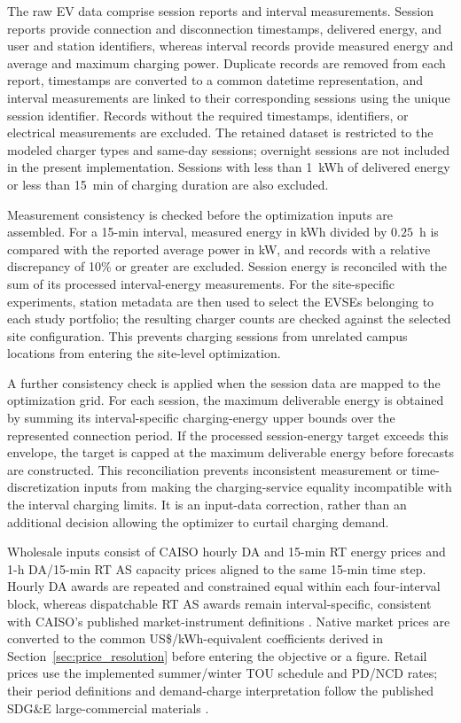 \documentclass[final,5p,times]{elsarticle}
\begin{document}
The raw EV data comprise session reports and interval
measurements. Session reports provide connection and
disconnection timestamps, delivered energy, and user and
station identifiers, whereas interval records provide measured
energy and average and maximum charging power. Duplicate
records are removed from each report, timestamps are converted
to a common datetime representation, and interval measurements
are linked to their corresponding sessions using the unique
session identifier. Records without the required timestamps,
identifiers, or electrical measurements are excluded. The
retained dataset is restricted to the modeled charger types
and same-day sessions; overnight sessions are not included in
the present implementation. Sessions with less than
1~kWh of delivered energy or less than 15~min of charging
duration are also excluded.

Measurement consistency is checked before the optimization
inputs are assembled. For a 15-min interval, measured energy
in kWh divided by $0.25$~h is compared with the reported
average power in kW, and records with a relative discrepancy
of 10\% or greater are excluded. Session energy is reconciled
with the sum of its processed interval-energy measurements.
For the site-specific experiments, station metadata are then
used to select the EVSEs belonging to each study portfolio;
the resulting charger counts are checked against the selected
site configuration. This prevents charging sessions from
unrelated campus locations from entering the site-level
optimization.

A further consistency check is applied when the session data
are mapped to the optimization grid. For each session, the
maximum deliverable energy is obtained by summing its
interval-specific charging-energy upper bounds over the
represented connection period. If the processed session-energy
target exceeds this envelope, the target is capped at the
maximum deliverable energy before forecasts are constructed.
This reconciliation prevents inconsistent measurement or
time-discretization inputs from making the charging-service
equality incompatible with the interval charging limits.
It is an input-data correction, rather than an additional
decision allowing the optimizer to curtail charging demand.

Wholesale inputs consist of CAISO hourly DA and 15-min RT energy prices and 1-h DA/15-min RT AS capacity prices aligned to the same 15-min time step. Hourly DA awards are
repeated and constrained equal within each four-interval block, whereas dispatchable RT AS awards remain interval-specific, consistent with CAISO's published market-instrument definitions \cite{caisoMarketInstruments2026} \cite{caisoMarketOperations2026}.
Native market prices are converted to the common US\$/kWh-equivalent coefficients derived in Section~\ref{sec:price_resolution} before entering the
objective or a figure. Retail prices use the implemented summer/winter TOU schedule and PD/NCD rates; their period definitions and demand-charge interpretation follow the published SDG\&E large-commercial materials \cite{sdgeLargeCommercial2025} \cite{sdgeDemandGuide2026}.
\end{document}
